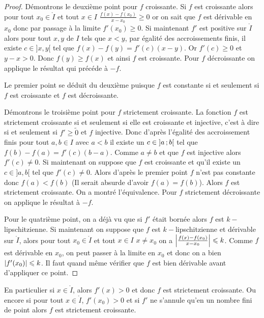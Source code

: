 \begin{proof}
  Démontrons le deuxième point pour $f$ croissante. Si $f$ est croissante alors pour tout $x_0 \in \mathring{I}$ et tout $x \in I$ $\frac{f(x)-f(x_0)}{x-x_0} \geqslant 0$ or on sait que $f$ est dérivable en $x_0$ donc par passage à la limite $f'(x_0) \geqslant 0$. Si maintenant $f'$ est positive sur $\mathring{I}$ alors pour tout $x,y$ de $I$ tels que $x < y$, par égalité des accroissements finis, il existe $c \in ]x,y[$ tel que $f(x)-f(y) = f'(c)(x-y)$. Or $f'(c) \geqslant 0$ et $y-x > 0$. Donc $f(y) \geqslant f(x)$ et ainsi $f$ est croissante. Pour $f$ décroissante on applique le résultat qui précéde à $-f$.

Le premier point se déduit du deuxième puisque $f$ est constante si et seulement si $f$ est croissante et $f$ est décroissante.

Démontrons le troisième point pour $f$ strictement croissante. La fonction $f$ est strictement croissante si et seulement si elle est croissante et injective, c'est à dire si et seulement si $f' \geqslant \tilde{0}$ et $f$ injective. Donc d'après l'égalité des accroissement finis pour tout $a,b \in I$ avec $a <b$ il existe un $c \in \left] a \, ;  b \right[$ tel que $f(b)-f(a)=f'(c)(b-a)$. Comme $a \neq b$ et que $f$ est injective alors $f'(c) \neq 0$. Si maintenant on suppose que $f$ est croissante et qu'il existe un $c \in ]a,b[$ tel que $f'(c) \neq 0$. Alors d'après le premier point $f$ n'est pas constante donc $f(a) < f(b)$ (Il serait absurde d'avoir $f(a)=f(b)$). Alors $f$ est strictement croissante. On a montré l'équivalence. Pour $f$ strictement décroissante on applique le résultat à $-f$.

Pour le quatrième point, on a déjà vu que si $f'$ était bornée alors $f$ est $k-$lipschitzienne. Si maintenant on suppose que $f$ est $k-$lipschitzienne et dérivable sur $\mathring{I}$, alors pour tout $x_0 \in \mathring{I}$ et tout $x \in I$ $x \neq x_0$ on a $\left\lvert\frac{f(x)-f(x_0)}{x-x_0}\right\rvert \leqslant k$. Comme $f$ est dérivable en $x_0$, on peut passer à la limite en $x_0$ et donc on a bien $\left\lvert f'(x_0)\right\rvert \leqslant k$. Il faut quand même vérifier que $f$ est bien dérivable avant d'appliquer ce point.
\end{proof}

En particulier si $x \in \mathring{I}$, alors $f'(x)>0$ et donc $f$ est strictement croissante. Ou encore si pour tout $x \in \mathring{I}$,  $f'(x_0) >0$ et si $f'$ ne s'annule qu'en un nombre fini de point alors $f$ est strictement croissante.

